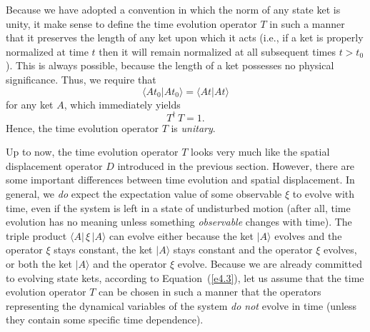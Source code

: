 Because we have adopted a convention in which the norm of any state ket is unity,
it make sense to define the time evolution operator $T$ in such a manner that
it preserves the length of any ket upon which it acts
({\rm i.e.}, if a ket is properly normalized at time $t$ then it will remain normalized at
all subsequent times $t>t_0$).
This is always possible,
because the length of a ket possesses no physical significance. Thus,
we require that
\begin{equation} 
\langle A t_0|A t_0\rangle =\langle A t|A t\rangle
\end{equation}
for any ket $A$, 
which immediately yields 
\begin{equation}\label{e4.5}
T^{\dag}\,T = 1.
\end{equation}
Hence, the time evolution operator $T$ is  {\em unitary}. 

Up to now, the time evolution operator $T$ looks very much like the 
spatial displacement
operator $D$ introduced in the previous section. However, there are some
important differences between time evolution and spatial displacement. In general,
we {\em do}\/ expect the expectation value of some observable $\xi$ to
evolve with time, even if the system is left in a state of undisturbed motion
(after all, time evolution has no meaning unless something {\em observable}
changes with time). The triple product $\langle A|\,\xi\,|A\rangle$ can evolve
either because the ket $|A\rangle$ evolves and the operator $\xi$ stays constant,
the ket $|A\rangle$ stays constant and the operator $\xi$ evolves, or both
the ket $|A\rangle$ and the operator $\xi$ evolve. 
Because we are already committed to evolving state kets, according to Equation~(\ref{e4.3}),
let us assume that the time evolution operator $T$ can be chosen in such a
manner that the operators representing the dynamical variables of the
system {\em do not}\/
 evolve in time (unless they contain some specific time dependence). 


